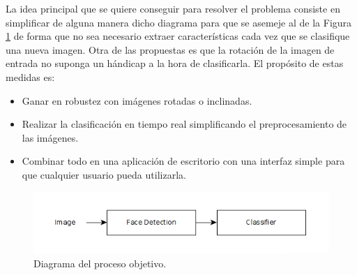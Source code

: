 \documentclass[a4paper,11pt]{book}
\begin{document}
La idea principal que se quiere conseguir para resolver el problema consiste en simplificar de alguna manera dicho diagrama para que se asemeje al de la Figura \ref{fig:my_fer_diagram} de forma que no sea necesario extraer características cada vez que se clasifique una nueva imagen. Otra de las propuestas es que la rotación de la imagen de entrada no suponga un hándicap a la hora de clasificarla. El propósito de estas medidas es:\\
\begin{itemize}
	\item Ganar en robustez con imágenes rotadas o inclinadas.
	\item Realizar la clasificación en tiempo real simplificando el preprocesamiento de las imágenes.
	\item Combinar todo en una aplicación de escritorio con una interfaz simple  para que cualquier usuario pueda utilizarla.
\end{itemize}

\begin{figure}[h]
	\centering
	\includegraphics[width=0.7\linewidth]{imagenes/my_fer_diagram}
	\caption[my_diagram]{Diagrama del proceso objetivo.}
	\label{fig:my_fer_diagram}
\end{figure}

\end{document}
